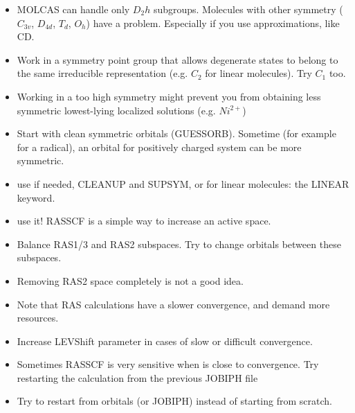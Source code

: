 
\begin{itemize}
\item MOLCAS can handle only $D_2h$ subgroups. Molecules with other 
symmetry ($C_{3v}$, $D_{4d}$, $T_d$, $O_h$) have a problem. 
Especially if you use approximations, like CD.
\item Work in a symmetry point group that allows degenerate states to belong to the 
same irreducible representation (e.g. $C_2$ for linear molecules). Try $C_1$ too. 
\item Working in a too high symmetry might prevent you from obtaining less 
symmetric lowest-lying localized solutions (e.g. $Ni^{2+}$) 
\item Start with clean symmetric orbitals (GUESSORB). Sometime (for example
 for a radical), an orbital
 for positively charged system can be more symmetric.
\item use if needed, CLEANUP and SUPSYM, or for linear molecules: the 
LINEAR keyword. 
\end{itemize} 



\begin{itemize}
\item use it! RASSCF is a simple way to increase an active space.
\item Balance RAS1/3 and RAS2 subspaces. Try to change orbitals between 
these subspaces.
\item Removing RAS2 space completely is not a good idea.
\item Note that RAS calculations have a slower convergence, and demand more
resources.
\end{itemize}


\begin{itemize}
\item Increase LEVShift parameter in cases of slow or difficult convergence. 
\item Sometimes RASSCF is very sensitive when is close to convergence.
Try restarting the calculation from the previous JOBIPH file
\item Try to restart from orbitals (or JOBIPH) instead of starting from scratch.
\end{itemize}

